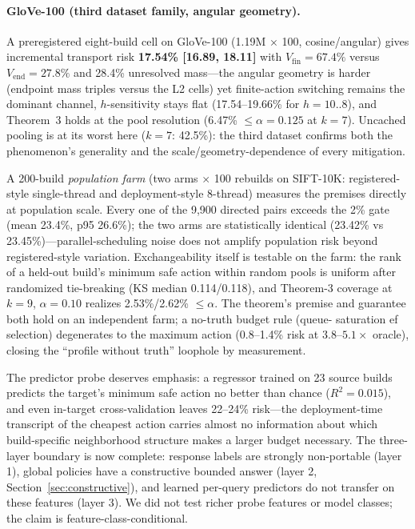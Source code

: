 \documentclass{article}
\begin{document}
\paragraph{GloVe-100 (third dataset family, angular geometry).}
A preregistered eight-build cell on GloVe-100 (1.19M $\times$ 100, cosine/angular) gives incremental
transport risk \textbf{17.54\% [16.89, 18.11]} with $V_{\mathrm{fin}}{=}67.4\%$ versus
$V_{\mathrm{end}}{=}27.8\%$ and 28.4\% unresolved mass---the angular geometry is harder (endpoint
mass triples versus the L2 cells) yet finite-action switching remains the dominant channel,
$h$-sensitivity stays flat (17.54--19.66\% for $h{=}10{..}8$), and Theorem~3 holds at the pool
resolution (6.47\% $\le\alpha{=}0.125$ at $k{=}7$). Uncached pooling is at its worst here
($k{=}7$: 42.5\%): the third dataset confirms both the phenomenon's generality and the
scale/geometry-dependence of every mitigation.

A 200-build \emph{population farm} (two arms $\times$ 100 rebuilds on SIFT-10K: registered-style
single-thread and deployment-style 8-thread) measures the premises directly at population scale. Every one
of the 9{,}900 directed pairs exceeds the 2\% gate (mean 23.4\%, p95 26.6\%); the two arms are
statistically identical (23.42\% vs 23.45\%)---parallel-scheduling noise does not amplify population risk
beyond registered-style variation. Exchangeability itself is testable on the farm: the rank of a held-out
build's minimum safe action within random pools is uniform after randomized tie-breaking (KS median
0.114/0.118), and Theorem-3 coverage at $k{=}9$, $\alpha{=}0.10$ realizes 2.53\%/2.62\% $\le\alpha$.
The theorem's premise and guarantee both hold on an independent farm; a no-truth budget rule (queue-
saturation ef selection) degenerates to the maximum action (0.8--1.4\% risk at $3.8$--$5.1\times$ oracle),
closing the ``profile without truth'' loophole by measurement.

The predictor probe deserves emphasis: a regressor trained on 23 source builds predicts the target's
minimum safe action no better than chance ($R^2=0.015$), and even in-target cross-validation leaves
22--24\% risk---the deployment-time transcript of the cheapest action carries almost no information about
which build-specific neighborhood structure makes a larger budget necessary. The three-layer boundary is
now complete: response labels are strongly non-portable (layer 1), global policies have a constructive
bounded answer (layer 2, Section~\ref{sec:constructive}), and learned per-query predictors do not transfer
on these features (layer 3). We did not test richer probe features or model classes; the claim is
feature-class-conditional.
\end{document}
